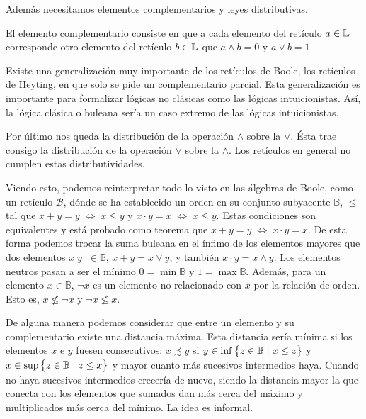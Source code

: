 \documentclass[final,12pt,a4paper,twoside,fleqn]{extbook}
\newcommand {\setCompr}[2]{
	\ensuremath{
		\left\lbrace{ 
			#1 {\;\big{\vert}\;} #2
        }\right\rbrace
    }
}
\newcommand{\setB}{\ensuremath{\mathbb{B}}}
\newcommand{\algB}{\ensuremath{\mathscr{B}}}
\theoremstyle{definition}
\theoremstyle{remark}
\begin{document}
	Además necesitamos elementos complementarios y leyes distributivas.



	El elemento complementario consiste en que a cada elemento del retículo
\(a\in\mathbb{L}\) corresponde otro elemento del retículo
\(b\in\mathbb{L}\) que \(a\wedge b = 0\) y \(a\vee b = 1\).



	Existe una generalización muy importante de los retículos de Boole, los
retículos de Heyting, en que solo se pide un complementario parcial. Esta
generalización es importante para formalizar lógicas no clásicas como las
lógicas intuicionistas. Así, la lógica clásica o buleana sería un caso
extremo de las lógicas intuicionistas.



	Por último nos queda la distribución de la operación \(\wedge\) sobre la
\(\vee\). Ésta trae consigo la distribución de la operación \(\vee\) sobre la
\(\wedge\). Los retículos en general no cumplen estas distributividades.



	Viendo esto, podemos reinterpretar todo lo visto en las álgebras de
Boole, como un retículo \(\algB\), dónde se ha establecido un orden en su
conjunto subyacente \(\setB\), \(\leq\) tal que \(x+y = y \;\iff \; x \leq
y\) y \(x \cdot y = x \;\iff \; x \leq y\). Estas condiciones son
equivalentes y está probado como teorema que \(x+y = y \;\iff \; x\cdot y =
x\). De esta forma podemos trocar la suma buleana en el ínfimo de los
elementos mayores que dos elementos \(x\;y\;\;\in\setB\), \(x+y = x\vee y\),
y también \(x \cdot y = x \wedge y\). Los elementos neutros pasan a ser el
mínimo \(0 = \min\setB\) y \(1 = \max\setB\). Además, para un elemento
\(x\in\setB\), \(\neg x\) es un elemento no relacionado con \(x\) por la
relación de orden. Esto es, \(x \nleq \neg x\) y \(\neg x \nleq x\).



	De alguna manera podemos considerar que entre un elemento y su
complementario existe una distancia máxima. Esta distancia sería mínima si
los elementos \(x\) e \(y\) fuesen consecutivos: \(x \precsim y\) si \( y \in
\inf \setCompr{z \in \setB}{x \leq z} \) y \( x \in \sup \setCompr{z \in
\setB}{z \leq x}\) y mayor cuanto más sucesivos intermedios haya. Cuando no
haya sucesivos intermedios crecería de nuevo, siendo la distancia mayor la
que conecta con los elementos que sumados dan más cerca del máximo y
multiplicados más cerca del mínimo. La idea es informal.
\end{document}
